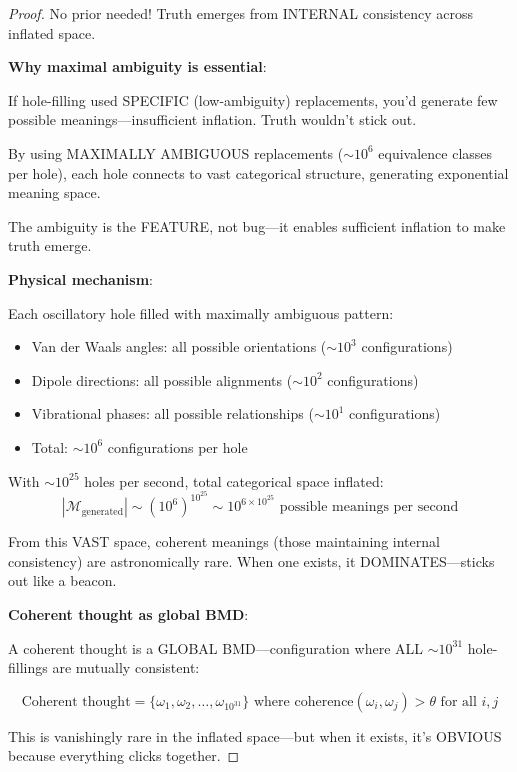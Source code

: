 \documentclass[11pt,a4paper]{article}
\begin{document}
\begin{proof}
No prior needed! Truth emerges from INTERNAL consistency across inflated space.

\textbf{Why maximal ambiguity is essential}:

If hole-filling used SPECIFIC (low-ambiguity) replacements, you'd generate few possible meanings—insufficient inflation. Truth wouldn't stick out.

By using MAXIMALLY AMBIGUOUS replacements ($\sim 10^6$ equivalence classes per hole), each hole connects to vast categorical structure, generating exponential meaning space.

The ambiguity is the FEATURE, not bug—it enables sufficient inflation to make truth emerge.

\textbf{Physical mechanism}:

Each oscillatory hole filled with maximally ambiguous pattern:
\begin{itemize}
\item Van der Waals angles: all possible orientations ($\sim 10^3$ configurations)
\item Dipole directions: all possible alignments ($\sim 10^2$ configurations)  
\item Vibrational phases: all possible relationships ($\sim 10^1$ configurations)
\item Total: $\sim 10^6$ configurations per hole
\end{itemize}

With $\sim 10^{25}$ holes per second, total categorical space inflated:
\begin{equation}
|\mathcal{M}_{\text{generated}}| \sim (10^6)^{10^{25}} \sim 10^{6 \times 10^{25}} \text{ possible meanings per second}
\end{equation}

From this VAST space, coherent meanings (those maintaining internal consistency) are astronomically rare. When one exists, it DOMINATES—sticks out like a beacon.

\textbf{Coherent thought as global BMD}:

A coherent thought is a GLOBAL BMD—configuration where ALL $\sim 10^{31}$ hole-fillings are mutually consistent:

\begin{equation}
\text{Coherent thought} = \{\omega_1, \omega_2, \ldots, \omega_{10^{31}}\} \text{ where } \text{coherence}(\omega_i, \omega_j) > \theta \text{ for all } i,j
\end{equation}

This is vanishingly rare in the inflated space—but when it exists, it's OBVIOUS because everything clicks together.


\end{proof}
\end{document}
